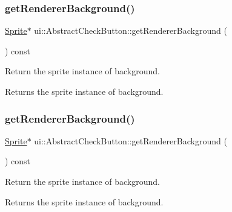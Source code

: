 \subsubsection{\texorpdfstring{get\+Renderer\+Background()}{getRendererBackground()}\hspace{0.1cm}{\footnotesize\ttfamily [1/2]}}
{\footnotesize\ttfamily \hyperlink{classSprite}{Sprite}$\ast$ ui\+::\+Abstract\+Check\+Button\+::get\+Renderer\+Background (\begin{DoxyParamCaption}{ }\end{DoxyParamCaption}) const\hspace{0.3cm}{\ttfamily [inline]}}



Return the sprite instance of background. 

\begin{DoxyReturn}{Returns}
the sprite instance of background. 
\end{DoxyReturn}
\mbox{\label{classui_1_1AbstractCheckButton_addc339c5331dc8427b525d1ccb675f00}} 
\subsubsection{\texorpdfstring{get\+Renderer\+Background()}{getRendererBackground()}\hspace{0.1cm}{\footnotesize\ttfamily [2/2]}}
{\footnotesize\ttfamily \hyperlink{classSprite}{Sprite}$\ast$ ui\+::\+Abstract\+Check\+Button\+::get\+Renderer\+Background (\begin{DoxyParamCaption}{ }\end{DoxyParamCaption}) const\hspace{0.3cm}{\ttfamily [inline]}}



Return the sprite instance of background. 

\begin{DoxyReturn}{Returns}
the sprite instance of background. 
\end{DoxyReturn}
\mbox{\label{classui_1_1AbstractCheckButton_a0dedc2cffba903975cfff7a6c21d90e8}} 
